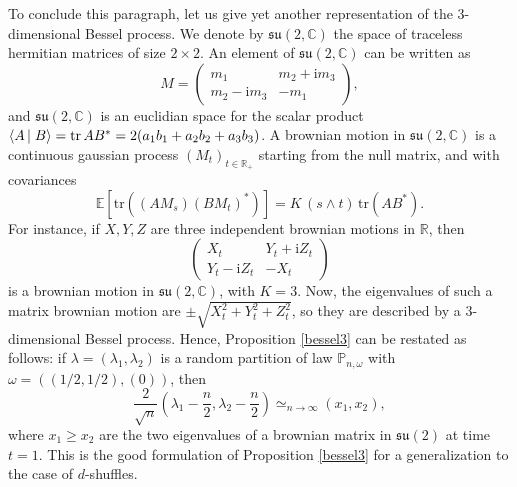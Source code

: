 \documentclass[smallextended,nospthms]{svjour3}
\theoremstyle{remark}
\newcommand{\I}{\mathrm{i}}
\newcommand{\R}{\mathbb{R}}
\newcommand{\C}{\mathbb{C}}
\newcommand{\proba}{\mathbb{P}}
\newcommand{\esper}{\mathbb{E}}
\newcommand{\tr}{\mathrm{tr}\,}
\newcommand{\scal}[2]{\left\langle #1\vphantom{#2}\,\right |\left.#2 \vphantom{#1}\right\rangle}
\begin{document}
\bigskip
\bigskip

To conclude this paragraph, let us give yet another representation of the $3$-dimensional Bessel process. We denote by $\mathfrak{su}(2,\C)$ the space of traceless hermitian matrices of size $2\times 2$. An element of $\mathfrak{su}(2,\C)$ can be written as
$$M=\begin{pmatrix}m_{1} & m_{2}+\I m_{3}\\
m_{2}-\I m_{3} & -m_{1}\end{pmatrix},$$
and $\mathfrak{su}(2,\C)$ is an euclidian space for the scalar product $\scal{A}{B}=\tr AB^{*}=2(a_{1}b_{1}+a_{2}b_{2}+a_{3}b_{3})$. A brownian motion in $\mathfrak{su}(2,\C)$ is a continuous gaussian process $(M_{t})_{t \in \R_{+}}$ starting from the null matrix, and with covariances 
$$\esper[\mathrm{tr}((AM_{s})(BM_{t})^{*})]=K\,(s\wedge t)\,\mathrm{tr}(AB^{*}).$$
For instance, if $X,Y,Z$ are three independent brownian motions in $\R$, then 
$$\begin{pmatrix}X_{t} & Y_{t}+\I Z_{t}\\
Y_{t} - \I Z_{t}& -X_{t}\end{pmatrix}$$
is a brownian motion in $\mathfrak{su}(2,\C)$, with $K=3$. Now, the eigenvalues of such a matrix brownian motion are $\pm \sqrt{X_{t}^{2}+Y_{t}^{2}+Z_{t}^{2}}$, so they are described by a $3$-dimensional Bessel process. Hence, Proposition \ref{bessel3} can be restated as follows: if $\lambda=(\lambda_{1},\lambda_{2})$ is a random partition of law $\proba_{n,\omega}$ with $\omega = ((1/2,1/2),(0))$, then
$$\frac{2}{\sqrt{n}}\left(\lambda_{1}-\frac{n}{2},\lambda_{2}-\frac{n}{2}\right) \simeq_{n \to \infty} (x_{1},x_{2}),$$
where $x_{1}\geq x_{2}$ are the two eigenvalues of a brownian matrix in $\mathfrak{su}(2)$ at time $t=1$. This is the good formulation of Proposition \ref{bessel3} for a generalization to the case of $d$-shuffles.
\end{document}
